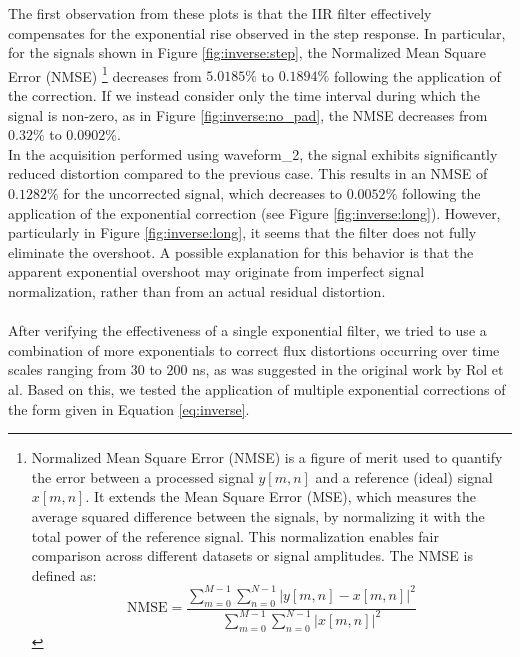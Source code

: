 The first observation from these plots is that the IIR filter effectively compensates for the exponential rise observed in the step response.
%
In particular, for the signals shown in Figure \ref{fig:inverse:step}, the Normalized Mean Square Error (NMSE)
\footnote{Normalized Mean Square Error (NMSE) is a figure of merit used to quantify the error between a processed signal $y[m,n]$ and a reference (ideal) signal $x[m,n]$. It extends the Mean Square Error (MSE), which measures the average squared difference between the signals, by normalizing it with the total power of the reference signal. This normalization enables fair comparison across different datasets or signal amplitudes. The NMSE is defined as:
\[
\text{NMSE} = \frac{\sum_{m=0}^{M-1} \sum_{n=0}^{N-1} |y[m,n] - x[m,n]|^2}{\sum_{m=0}^{M-1} \sum_{n=0}^{N-1} |x[m,n]|^2}
\]
} decreases from $5.0185\%$ to $0.1894\%$ following the application of the correction.
If we instead consider only the time interval during which the signal is non-zero, as in Figure \ref{fig:inverse:no_pad}, the NMSE decreases from $0.32\%$ to $0.0902\%$.\\
In the acquisition performed using waveform\_2, the signal exhibits significantly reduced distortion compared to the previous case. 
This results in an NMSE of $0.1282\%$ for the uncorrected signal, which decreases to $0.0052\%$ following the application of the exponential correction (see Figure \ref{fig:inverse:long}).
%
However, particularly in Figure \ref{fig:inverse:long}, it seems that the filter does not fully eliminate the overshoot. 
A possible explanation for this behavior is that the apparent exponential overshoot may originate from imperfect signal normalization, rather than from an actual residual distortion.
\paragraph{}
After verifying the effectiveness of a single exponential filter, we tried to use a combination of more exponentials to correct flux distortions occurring over time scales ranging from $30$ to $200$ ns, as was suggested in the original work by Rol et al. 
Based on this, we tested the application of multiple exponential corrections of the form given in Equation \ref{eq:inverse}.

